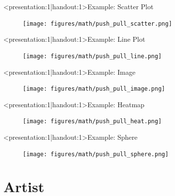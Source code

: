 \documentclass[xcolor={dvipsnames}]{beamer}
\begin{document}
\begin{frame}<presentation:1|handout:1>{Example: Scatter Plot}
    \begin{figure}
        \texttt{[image: figures/math/push\_pull\_scatter.png]}
    \end{figure}
\end{frame}

\begin{frame}<presentation:1|handout:1>{Example: Line Plot}
    \begin{figure}
        \texttt{[image: figures/math/push\_pull\_line.png]}
    \end{figure}
\end{frame}

\begin{frame}<presentation:1|handout:1>{Example: Image}
    \begin{figure}
        \texttt{[image: figures/math/push\_pull\_image.png]}
    \end{figure}
\end{frame}

\begin{frame}<presentation:1|handout:1>{Example: Heatmap}
    \begin{figure}
        \texttt{[image: figures/math/push\_pull\_heat.png]}
    \end{figure}
\end{frame}

\begin{frame}<presentation:1|handout:1>{Example: Sphere}
    \begin{figure}
        \texttt{[image: figures/math/push\_pull\_sphere.png]}
    \end{figure}
\end{frame}


\section{Artist}
\end{document}
